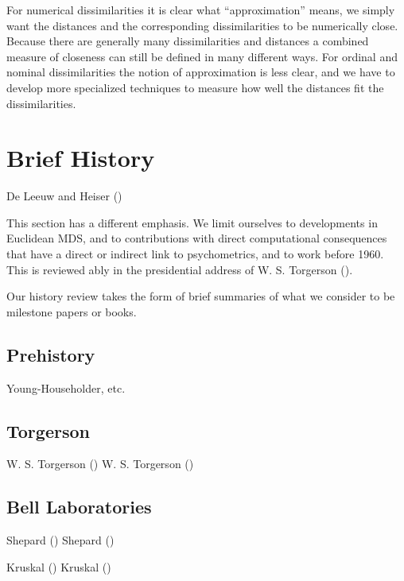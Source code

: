 \documentclass[
  12pt,
  letterpaper,
  DIV=11,
  numbers=noendperiod]{scrartcl}
\begin{document}
For numerical dissimilarities it is clear what ``approximation'' means,
we simply want the distances and the corresponding dissimilarities to be
numerically close. Because there are generally many dissimilarities and
distances a combined measure of closeness can still be defined in many
different ways. For ordinal and nominal dissimilarities the notion of
approximation is less clear, and we have to develop more specialized
techniques to measure how well the distances fit the dissimilarities.

\section{Brief History}\label{introhist}

De Leeuw and Heiser ()

This section has a different emphasis. We limit ourselves to
developments in Euclidean MDS, and to contributions with direct
computational consequences that have a direct or indirect link to
psychometrics, and to work before 1960. This is reviewed ably in the
presidential address of W. S. Torgerson
().

Our history review takes the form of brief summaries of what we consider
to be milestone papers or books.

\subsection{Prehistory}\label{prehistory}

Young-Householder, etc.

\subsection{Torgerson}\label{torgerson}

W. S. Torgerson () W. S. Torgerson
()

\subsection{Bell Laboratories}\label{bell-laboratories}

Shepard () Shepard
()

Kruskal () Kruskal
()
\end{document}
